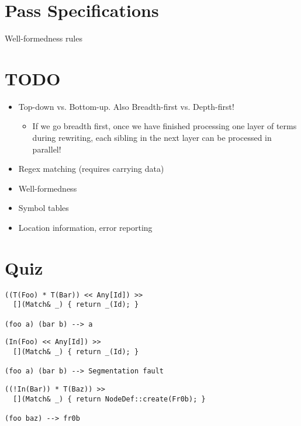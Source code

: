\documentclass{article}
\begin{document}
\section{Pass Specifications}

Well-formedness rules

\section*{TODO}

\begin{itemize}
\item Top-down vs. Bottom-up. Also Breadth-first vs. Depth-first!
  \begin{itemize}
  \item If we go breadth first, once we have finished processing
    one layer of terms during rewriting, each sibling in the next
    layer can be processed in parallel!
  \end{itemize}
\item Regex matching (requires carrying data)
\item Well-formedness
\item Symbol tables
\item Location information, error reporting
\end{itemize}

\section*{Quiz}

\begin{verbatim}
((T(Foo) * T(Bar)) << Any[Id]) >>
  [](Match& _) { return _(Id); }

(foo a) (bar b) --> a
\end{verbatim}

\begin{verbatim}
(In(Foo) << Any[Id]) >>
  [](Match& _) { return _(Id); }

(foo a) (bar b) --> Segmentation fault
\end{verbatim}

\begin{verbatim}
((!In(Bar)) * T(Baz)) >>
  [](Match& _) { return NodeDef::create(Fr0b); }

(foo baz) --> fr0b
\end{verbatim}
\end{document}
